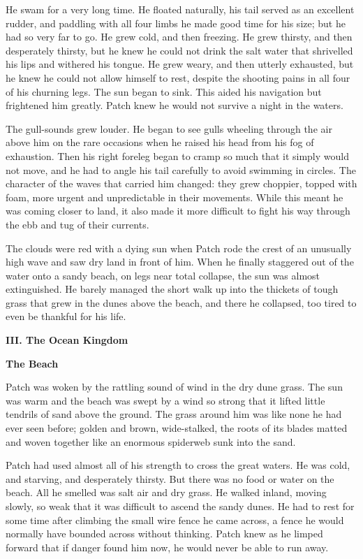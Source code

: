 \documentclass[11pt]{article}
\begin{document}
He swam for a very long time. He floated naturally, his tail served as an excellent rudder, and paddling with all four limbs he made good time for his size; but he had so very far to go. He grew cold, and then freezing. He grew thirsty, and then desperately thirsty, but he knew he could not drink the salt water that shrivelled his lips and withered his tongue. He grew weary, and then utterly exhausted, but he knew he could not allow himself to rest, despite the shooting pains in all four of his churning legs. The sun began to sink. This aided his navigation but frightened him greatly. Patch knew he would not survive a night in the waters.\par
 The gull-sounds grew louder. He began to see gulls wheeling through the air above him on the rare occasions when he raised his head from his fog of exhaustion. Then his right foreleg began to cramp so much that it simply would not move, and he had to angle his tail carefully to avoid swimming in circles. The character of the waves that carried him changed: they grew choppier, topped with foam, more urgent and unpredictable in their movements. While this meant he was coming closer to land, it also made it more difficult to fight his way through the ebb and tug of their currents.\par
 The clouds were red with a dying sun when Patch rode the crest of an unusually high wave and saw dry land in front of him. When he finally staggered out of the water onto a sandy beach, on legs near total collapse, the sun was almost extinguished. He barely managed the short walk up into the thickets of tough grass that grew in the dunes above the beach, and there he collapsed, too tired to even be thankful for his life.\par
\pagebreak \par
{\bf III. The Ocean Kingdom\par

}\par
{\bf The Beach\par
}\par
 Patch was woken by the rattling sound of wind in the dry dune grass. The sun was warm and the beach was swept by a wind so strong that it lifted little tendrils of sand above the ground. The grass around him was like none he had ever seen before; golden and brown, wide-stalked, the roots of its blades matted and woven together like an enormous spiderweb sunk into the sand.\par
 Patch had used almost all of his strength to cross the great waters. He was cold, and starving, and desperately thirsty. But there was no food or water on the beach. All he smelled was salt air and dry grass. He walked inland, moving slowly, so weak that it was difficult to ascend the sandy dunes. He had to rest for some time after climbing the small wire fence he came across, a fence he would normally have bounded across without thinking. Patch knew as he limped forward that if danger found him now, he would never be able to run away.\par
\end{document}
